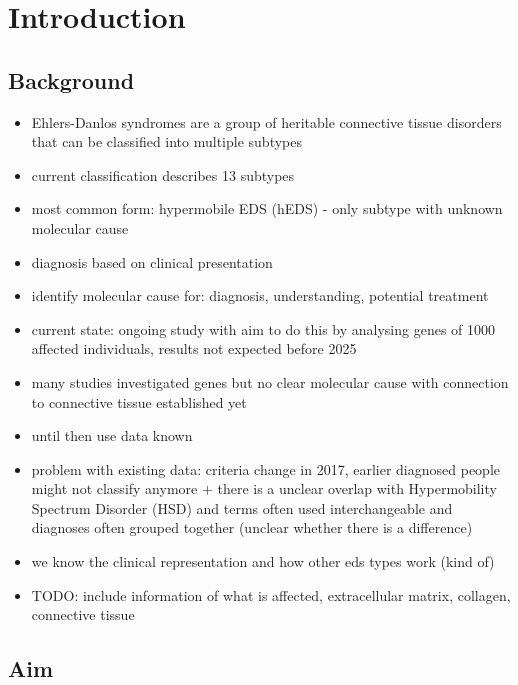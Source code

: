 \section{Introduction}

\subsection{Background}

\begin{itemize}
	\item Ehlers-Danlos syndromes are a group of heritable connective tissue disorders that can be classified into multiple subtypes
	\item current classification describes 13 subtypes \cite{classification2017}
	\item most common form: hypermobile EDS (hEDS) - only subtype with unknown molecular cause
	\item diagnosis based on clinical presentation
	\item identify molecular cause for: diagnosis, understanding, potential treatment \cite{Ritelli2020}
	\item current state: ongoing study with aim to do this by analysing genes of 1000 affected individuals, results not expected before 2025 \cite{HEDGE}
	\item many studies investigated genes but no clear molecular cause with connection to connective tissue established yet \cite{Caliogna2021}
	\item until then use data known
	\item problem with existing data: criteria change in 2017, earlier diagnosed people might not classify anymore \cite{Gensemer2021} + there is a unclear overlap with Hypermobility Spectrum Disorder (HSD) and terms often used interchangeable and diagnoses often grouped together (unclear whether there is a difference) \cite{Gensemer2021, Ritelli2022}
	\item we know the clinical representation and how other eds types work (kind of)
	\item TODO: include information of what is affected, extracellular matrix, collagen, connective tissue
\end{itemize}

\subsection{Aim}

